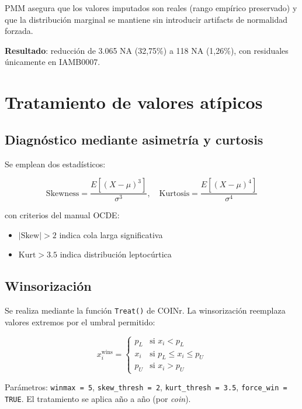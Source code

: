 PMM asegura que los valores imputados son reales (rango empírico preservado) y que la distribución marginal se mantiene sin introducir artifacts de normalidad forzada.

\textbf{Resultado}: reducción de 3.065 NA (32,75\%) a 118 NA (1,26\%), con residuales únicamente en IAMB0007.

\section{Tratamiento de valores atípicos}

\subsection{Diagnóstico mediante asimetría y curtosis}

Se emplean dos estadísticos:

\begin{equation}
    \text{Skewness} = \frac{E[(X - \mu)^3]}{\sigma^3}, \quad \text{Kurtosis} = \frac{E[(X - \mu)^4]}{\sigma^4}
\end{equation}

con criterios del manual OCDE:
\begin{itemize}
    \item $|\text{Skew}| > 2$ indica cola larga significativa
    \item $\text{Kurt} > 3.5$ indica distribución leptocúrtica
\end{itemize}

\subsection{Winsorización}

Se realiza mediante la función \texttt{Treat()} de COINr. La winsorización reemplaza valores extremos por el umbral permitido:

\begin{equation}
    x_i^{\text{wins}} = \begin{cases}
        p_L & \text{si } x_i < p_L \\
        x_i & \text{si } p_L \leq x_i \leq p_U \\
        p_U & \text{si } x_i > p_U
    \end{cases}
\end{equation}

Parámetros: \texttt{winmax = 5}, \texttt{skew\_thresh = 2}, \texttt{kurt\_thresh = 3.5}, \texttt{force\_win = TRUE}. El tratamiento se aplica año a año (por \emph{coin}).

